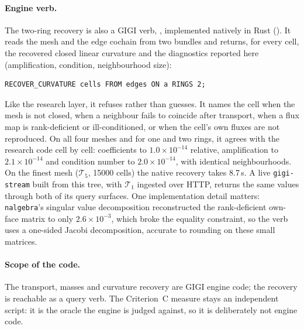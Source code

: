 \documentclass[11pt]{article}
\theoremstyle{definition}
\theoremstyle{remark}
\newcommand{\GIGI}{\textsc{GIGI}}
\newcommand{\BW}{Criterion~C}
\newcommand{\T}{\mathcal{T}}
\begin{document}
\paragraph{Engine verb.}
The two-ring recovery is also a \GIGI{} verb, , implemented
natively in Rust (). It reads the mesh and the
edge cochain from two bundles and returns, for every cell, the recovered closed linear
curvature and the diagnostics reported here (amplification, condition, neighbourhood
size):
\begin{lstlisting}[style=json]
RECOVER_CURVATURE cells FROM edges ON a RINGS 2;
\end{lstlisting}
Like the research layer, it refuses rather than guesses. It names the cell when the mesh
is not closed, when a neighbour fails to coincide after transport, when a flux map is
rank-deficient or ill-conditioned, or when the cell's own fluxes are not reproduced.
On all four meshes and for one and two rings, it agrees with the research code cell by
cell: coefficients to $1.0\times10^{-14}$ relative, amplification to $2.1\times10^{-14}$ and
condition number to $2.0\times10^{-14}$, with identical neighbourhoods. On the finest mesh
($\T_5$, 15000 cells) the native recovery takes 8.7\,s. A live
\texttt{gigi-stream} built from this tree, with $\T_1$ ingested over HTTP, returns the
same values through both of its query surfaces. One implementation detail matters: \texttt{nalgebra}'s singular value
decomposition reconstructed the rank-deficient own-face matrix to only $2.6\times10^{-3}$,
which broke the equality constraint, so the verb uses a one-sided Jacobi decomposition,
accurate to rounding on these small matrices.

\paragraph{Scope of the code.}
The transport, masses and curvature recovery are \GIGI{} engine code; the recovery is
reachable as a query verb. The \BW{} measure stays an independent script: it is the oracle
the engine is judged against, so it is deliberately not engine code.
\end{document}
